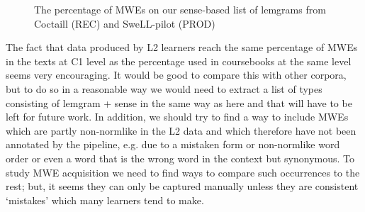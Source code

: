 \documentclass[output=paper,colorlinks,citecolor=brown]{langscibook}
\begin{document}
\begin{figure} 
    \caption{The percentage of MWEs on our sense-based list of lemgrams from Coctaill (REC) and SweLL-pilot (PROD)}
    \label{fig:MWElemgrams}
\end{figure}

The fact that data produced by L2 learners reach the same percentage of MWEs in the texts at C1 level as the percentage used in coursebooks at the same level seems very encouraging. It would be good to compare this with other corpora, but to do so in a reasonable way we would need to extract a list of types consisting of lemgram + sense in the same way as here and that will have to be left for future work. In addition, we should try to find a way to include MWEs which are partly non-normlike in the L2 data and which therefore have not been annotated by the pipeline, e.g. due to a mistaken form or non-normlike word order or even a word that is the wrong word in the context but synonymous. 
To study MWE acquisition we need to find ways to compare such occurrences to the rest; but, it seems they can only be captured manually unless they are consistent ‘mistakes’ which many learners tend to make.
\end{document}
